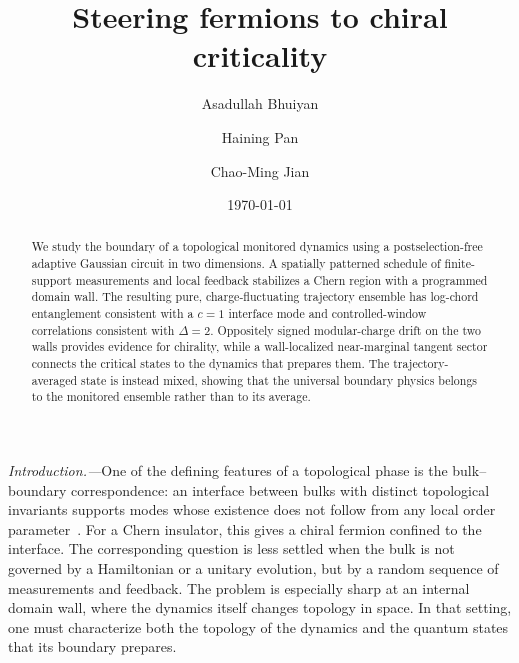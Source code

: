 \documentclass[aps,prl,twocolumn,floatfix,superscriptaddress,nofootinbib]{revtex4-2}
\begin{document}
\title{Steering fermions to chiral criticality}

\author{Asadullah Bhuiyan}
\author{Haining Pan}
\author{Chao-Ming Jian}

\date{\today}

\begin{abstract}
We study the boundary of a topological monitored dynamics using a postselection-free adaptive Gaussian circuit in two dimensions.  A spatially patterned schedule of finite-support measurements and local feedback stabilizes a Chern region with a programmed domain wall.  The resulting pure, charge-fluctuating trajectory ensemble has log-chord entanglement consistent with a $c=1$ interface mode and controlled-window correlations consistent with $\Delta=2$.  Oppositely signed modular-charge drift on the two walls provides evidence for chirality, while a wall-localized near-marginal tangent sector connects the critical states to the dynamics that prepares them.  The trajectory-averaged state is instead mixed, showing that the universal boundary physics belongs to the monitored ensemble rather than to its average.
\end{abstract}

\maketitle

\emph{Introduction.---}One of the defining features of a topological phase is the bulk--boundary correspondence: an interface between bulks with distinct topological invariants supports modes whose existence does not follow from any local order parameter~\cite{CallanHarvey1985,Hatsugai1993,HasanKaneRMP,QiZhangRMP,ChiuTeoSchnyderRyu2016}.  For a Chern insulator, this gives a chiral fermion confined to the interface.  The corresponding question is less settled when the bulk is not governed by a Hamiltonian or a unitary evolution, but by a random sequence of measurements and feedback.  The problem is especially sharp at an internal domain wall, where the dynamics itself changes topology in space.  In that setting, one must characterize both the topology of the dynamics and the quantum states that its boundary prepares.
\end{document}
